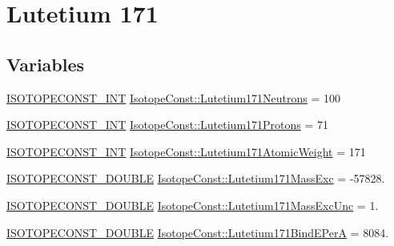 \hypertarget{group___isotope_const-_lutetium-_lu171}{}\section{Lutetium 171}
\label{group___isotope_const-_lutetium-_lu171}
\subsection*{Variables}
\begin{DoxyCompactItemize}
\item 
\mbox{\hyperlink{group___isotope_const-_macros_ga5f18360b3e99483a35c32d789e62621c}{I\+S\+O\+T\+O\+P\+E\+C\+O\+N\+S\+T\+\_\+\+I\+NT}} \mbox{\hyperlink{group___isotope_const-_lutetium-_lu171_gaccbfbf20b451b7e68a9701cbc9adf932}{Isotope\+Const\+::\+Lutetium171\+Neutrons}} = 100
\item 
\mbox{\hyperlink{group___isotope_const-_macros_ga5f18360b3e99483a35c32d789e62621c}{I\+S\+O\+T\+O\+P\+E\+C\+O\+N\+S\+T\+\_\+\+I\+NT}} \mbox{\hyperlink{group___isotope_const-_lutetium-_lu171_gae869fe471494ebae4092dbd28f7ceaad}{Isotope\+Const\+::\+Lutetium171\+Protons}} = 71
\item 
\mbox{\hyperlink{group___isotope_const-_macros_ga5f18360b3e99483a35c32d789e62621c}{I\+S\+O\+T\+O\+P\+E\+C\+O\+N\+S\+T\+\_\+\+I\+NT}} \mbox{\hyperlink{group___isotope_const-_lutetium-_lu171_gaf7b50d330e8a223bedf8777725502805}{Isotope\+Const\+::\+Lutetium171\+Atomic\+Weight}} = 171
\item 
\mbox{\hyperlink{group___isotope_const-_macros_ga8f45a7272ce02c0b4c65c44636ed719a}{I\+S\+O\+T\+O\+P\+E\+C\+O\+N\+S\+T\+\_\+\+D\+O\+U\+B\+LE}} \mbox{\hyperlink{group___isotope_const-_lutetium-_lu171_ga597007acb831055c7ab1c3a70e85be1d}{Isotope\+Const\+::\+Lutetium171\+Mass\+Exc}} = -\/57828.
\item 
\mbox{\hyperlink{group___isotope_const-_macros_ga8f45a7272ce02c0b4c65c44636ed719a}{I\+S\+O\+T\+O\+P\+E\+C\+O\+N\+S\+T\+\_\+\+D\+O\+U\+B\+LE}} \mbox{\hyperlink{group___isotope_const-_lutetium-_lu171_ga2c05433a6e2aa5bfe0e35e676e2f8202}{Isotope\+Const\+::\+Lutetium171\+Mass\+Exc\+Unc}} = 1.
\item 
\mbox{\hyperlink{group___isotope_const-_macros_ga8f45a7272ce02c0b4c65c44636ed719a}{I\+S\+O\+T\+O\+P\+E\+C\+O\+N\+S\+T\+\_\+\+D\+O\+U\+B\+LE}} \mbox{\hyperlink{group___isotope_const-_lutetium-_lu171_ga23d670772cfcc559e3a5a84467a781c3}{Isotope\+Const\+::\+Lutetium171\+Bind\+E\+PerA}} = 8084.
\item 

\end{DoxyCompactItemize}
